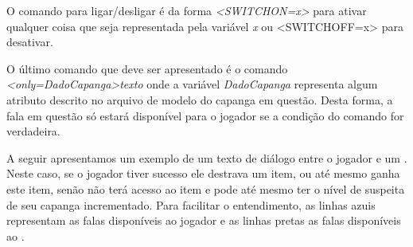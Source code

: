 O comando para ligar/desligar é da forma \emph{<SWITCHON=x>} para ativar qualquer coisa que seja representada pela variável \emph{x} ou {<SWITCHOFF=x>} para desativar.

O último comando que deve ser apresentado é o comando \emph{<only=DadoCapanga>texto} onde a variável \emph{DadoCapanga} representa algum atributo descrito no arquivo de modelo do capanga em questão. Desta forma, a fala em questão só estará disponível para o jogador se a condição do comando for verdadeira.

A seguir apresentamos um exemplo de um texto de diálogo entre o jogador e um \npc{}. Neste caso, se o jogador tiver sucesso ele destrava um item, ou até mesmo ganha este item, senão não terá acesso ao item e pode até mesmo ter o nível de suspeita de seu capanga incrementado.
Para facilitar o entendimento, as linhas azuis representam as falas disponíveis ao jogador e as linhas pretas as falas disponíveis ao \npc{}.
